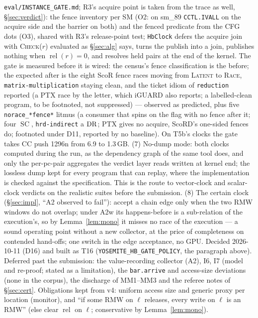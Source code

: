 \documentclass[11pt]{article}
\theoremstyle{remark}
\DeclareMathOperator{\rel}{rel}\DeclareMathOperator{\acq}{acq}\DeclareMathOperator{\key}{key}
\DeclareMathOperator{\SC}{SC}
\begin{document}
\texttt{eval/INSTANCE\_GATE.md}; R3's acquire point is taken from the trace as well, \S\ref{sec:verdict}): the fence inventory per SM (O2: on
sm\_89 \texttt{CCTL.IVALL} on the acquire side and the barrier on both) and the
$\mathrm{fenced}$ predicate from the CFG dots (O3), shared with R3's release-point test;
\texttt{HbClock} defers the acquire join with \textsc{Check}($r$) evaluated as \S\ref{sec:alg}
says, turns the publish into a join, publishes nothing when $\rel(r)=0$, and resolves
held pairs at the end of the kernel. The gate is measured before it is wired: the
census's fence classification is the before; the expected after is the eight ScoR fence
races moving from \textsc{Latent} to \textsc{Race}, \texttt{matrix-multiplication} staying
clean, and the ticket idiom of \texttt{reduction} reported (a PTX race by the letter,
which iGUARD also reports; a labelled-clean program, to be footnoted, not suppressed) ---
observed as predicted, plus five \texttt{norace\_*fence*} litmus (a consumer that spins on
the flag with no fence after it; four $\SC$, \texttt{hrd-indirect} a $\operatorname{DR}$; PTX gives no
acquire, ScoRD's one-sided fences do; footnoted under D11, reported by no baseline). On T5b's
clocks the gate takes CC push 1296n from 6.9 to 1.3\,GB. (7) No-dump mode: both clocks
computed during the run, as the dependency graph of the same tool does, and only the
per-pc-pair aggregates the verdict layer reads written at kernel end; the lossless dump kept
for every program that can replay, where the implementation is checked against the
specification. This is the route to vector-clock and scalar-clock verdicts on the realistic
suites before the submission. (8) The certain clock (\S\ref{sec:impl}, ``A2 observed to
fail''): accept a chain edge only when the two RMW windows do not overlap; under A2w its
happens-before is a sub-relation of the execution's, so by Lemma~\ref{lem:mono} it misses
no race of the execution --- a sound operating point without a new collector, at the price
of completeness on contended hand-offs; one switch in the edge acceptance, no GPU. Decided
2026-10-11 (D16) and built as T16 (\texttt{YOSEMITE\_HB\_GATE\_POLICY}, the paragraph above).
Deferred past the submission: the value-recording collector (A2), I6, I7 (model and
re-proof; stated as a limitation), the \texttt{bar.arrive} and access-size deviations
(none in the corpus), the discharge of MM1--MM3 and the referee notes of
\S\ref{sec:cert}. Obligations kept from v4: uniform access size and generic proxy per
location (monitor), and ``if some RMW on $\ell$ releases, every write on $\ell$ is an
RMW'' (else clear $\rel$ on $\ell$; conservative by Lemma~\ref{lem:mono}).
\end{document}
